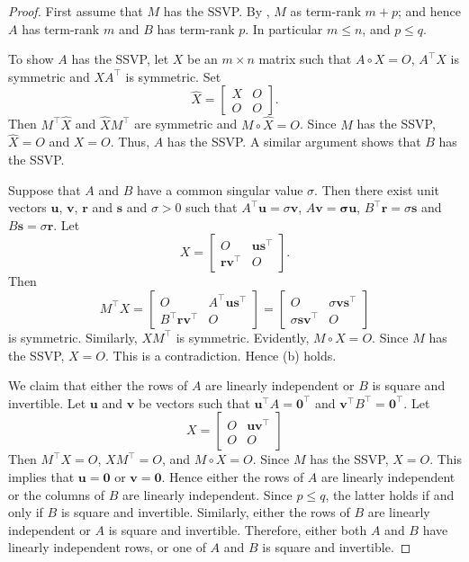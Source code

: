 \documentclass[preprint,12pt]{elsarticle}
\newcommand{\trans  }{^\top}
\begin{document}
\begin{proof}
First assume that $M$ has the SSVP. 
By , $M$ as term-rank $m+p$; and hence $A$ has term-rank $m$ and $B$ has term-rank $p$. 
In particular $m \leq n$, and $p \leq q$.

To show $A$ has the SSVP, let $X$ be an $m\times n$ matrix such that $A \circ X=O$, $A\trans X$
is symmetric and $XA\trans$ is symmetric. Set 
\[ 
\widehat{X} = \left[ \begin{array}{cc} 
X & O \\
O & O \end{array} \right].\]
Then $M\trans \widehat{X}$ and $\widehat{X} M\trans$ are symmetric and $M\circ \widehat{X}=O$.
Since $M$ has the SSVP, $\widehat{X}=O$ and $X=O$.  Thus, $A$ has the SSVP.
A similar argument shows that $B$ has the SSVP.

 Suppose that $A$ and $B$ have a common  singular value $\sigma$. Then  there exist unit vectors  $\mathbf u$, $\mathbf v$, $\mathbf r$ and $\mathbf s$ 
and $\sigma > 0$
such that $A\trans \mathbf u=\sigma \mathbf v$,  $A \mathbf v= \mathbf \sigma \mathbf u$, $B\trans \mathbf r=\sigma \mathbf s$ and $B \mathbf s=\sigma \mathbf r$.
Let 
\[ 
X= \left[ \begin{array}{cc}
O & \mathbf u \mathbf s\trans \\
\mathbf r \mathbf v\trans & O
\end{array} \right].
\]
Then 
\[ 
M\trans X= \left[ \begin{array}{cc}
O & A\trans \mathbf u  \mathbf s\trans \\
B\trans \mathbf r \mathbf v\trans & O 
\end{array} 
\right] = 
\left[ \begin{array}{cc} 
O & \sigma \mathbf v \mathbf s\trans \\
\sigma  \mathbf s \mathbf v\trans & O 
\end{array} \right] 
\]
is symmetric. Similarly, $XM\trans$ is symmetric. Evidently, $M \circ X=O$.  Since $M$ has the SSVP, 
$X=O$.  This is a contradiction. 
Hence (b) holds. 


We claim that either the rows of $A$ are linearly independent or $B$ is square and invertible. 
Let $\mathbf u$ and $\mathbf v$ be vectors such that $\mathbf u\trans A=\mathbf 0\trans$ and $\mathbf v\trans B\trans =\mathbf 0\trans$.
Let 
\[ 
X= \left[ 
\begin{array}{cc}
O & \mathbf u \mathbf v\trans\\
O & O 
\end{array} \right] 
\]
Then $M\trans X=O$, $XM\trans=O$, and $M\circ X=O$.  Since $M$ has the SSVP, $X=O$. 
This implies that $\mathbf u=\mathbf 0$ or $\mathbf v=\mathbf 0$. Hence either the rows of $A$ are linearly independent or the 
columns of $B$ are linearly independent.  Since $p\leq q$, the latter holds if and only if $B$ is square and invertible.
Similarly, either the rows of $B$ are linearly independent or  $A$ is square and invertible. 
Therefore, either both $A$ and $B$ have linearly independent rows, or one of $A$ and $B$ is square and invertible. 


\end{proof}
\end{document}
